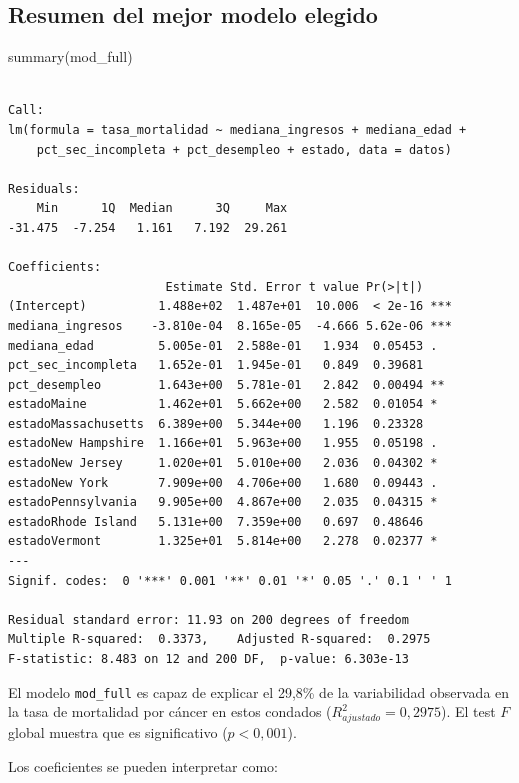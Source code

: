 \documentclass[
  spanish,
  a4paper,
]{scrbook}
\newenvironment{Shaded}{\begin{snugshade}}{\end{snugshade}}
\newcommand{\FunctionTok}[1]{\textcolor[rgb]{0.28,0.35,0.67}{#1}}
\newcommand{\NormalTok}[1]{\textcolor[rgb]{0.00,0.23,0.31}{#1}}
\begin{document}
\subsection{Resumen del mejor modelo
elegido}\label{resumen-del-mejor-modelo-elegido}

\begin{Shaded}
\begin{Highlighting}[]
\FunctionTok{summary}\NormalTok{(mod\_full)}
\end{Highlighting}
\end{Shaded}

\begin{verbatim}

Call:
lm(formula = tasa_mortalidad ~ mediana_ingresos + mediana_edad + 
    pct_sec_incompleta + pct_desempleo + estado, data = datos)

Residuals:
    Min      1Q  Median      3Q     Max 
-31.475  -7.254   1.161   7.192  29.261 

Coefficients:
                      Estimate Std. Error t value Pr(>|t|)    
(Intercept)          1.488e+02  1.487e+01  10.006  < 2e-16 ***
mediana_ingresos    -3.810e-04  8.165e-05  -4.666 5.62e-06 ***
mediana_edad         5.005e-01  2.588e-01   1.934  0.05453 .  
pct_sec_incompleta   1.652e-01  1.945e-01   0.849  0.39681    
pct_desempleo        1.643e+00  5.781e-01   2.842  0.00494 ** 
estadoMaine          1.462e+01  5.662e+00   2.582  0.01054 *  
estadoMassachusetts  6.389e+00  5.344e+00   1.196  0.23328    
estadoNew Hampshire  1.166e+01  5.963e+00   1.955  0.05198 .  
estadoNew Jersey     1.020e+01  5.010e+00   2.036  0.04302 *  
estadoNew York       7.909e+00  4.706e+00   1.680  0.09443 .  
estadoPennsylvania   9.905e+00  4.867e+00   2.035  0.04315 *  
estadoRhode Island   5.131e+00  7.359e+00   0.697  0.48646    
estadoVermont        1.325e+01  5.814e+00   2.278  0.02377 *  
---
Signif. codes:  0 '***' 0.001 '**' 0.01 '*' 0.05 '.' 0.1 ' ' 1

Residual standard error: 11.93 on 200 degrees of freedom
Multiple R-squared:  0.3373,    Adjusted R-squared:  0.2975 
F-statistic: 8.483 on 12 and 200 DF,  p-value: 6.303e-13
\end{verbatim}

El modelo \texttt{mod\_full} es capaz de explicar el 29,8\% de la
variabilidad observada en la tasa de mortalidad por cáncer en estos
condados (\(R^2_{ajustado} = 0,2975\)). El test \(F\) global muestra que
es significativo (\(p< 0,001\)).

Los coeficientes se pueden interpretar como:
\end{document}
